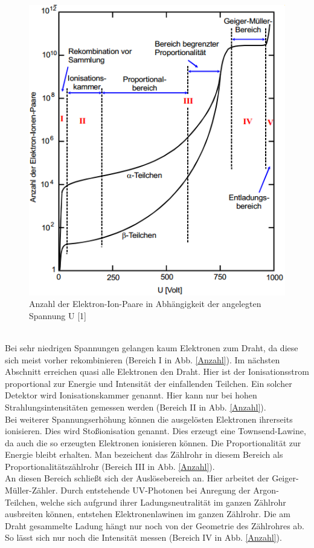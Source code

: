 	\begin{figure}[h]
		\begin{center}
		\includegraphics[scale=0.8]{Anzahl.png}
		\caption{Anzahl der Elektron-Ion-Paare in Abhängigkeit der angelegten Spannung U [1]}
		\label{Anzahl}
		\end{center}	
	\end{figure} \\
Bei sehr niedrigen Spannungen gelangen kaum Elektronen zum Draht, da diese sich meist vorher rekombinieren (Bereich I in Abb. \eqref{Anzahl}).
Im nächsten Abschnitt erreichen quasi alle Elektronen den Draht. Hier ist der Ionisationsstrom proportional zur Energie und Intensität der einfallenden Teilchen. Ein solcher Detektor wird Ionisationskammer genannt. Hier kann nur bei hohen Strahlungsintensitäten gemessen werden (Bereich II in Abb. \eqref{Anzahl}).\\
Bei weiterer Spannungserhöhung können die ausgelösten Elektronen ihrerseits ionisieren. Dies wird Stoßionisation genannt. Dies erzeugt eine Townsend-Lawine, da auch die so erzeugten Elektronen ionisieren können. Die Proportionalität zur Energie bleibt erhalten.
Man bezeichent das Zählrohr in diesem Bereich als Proportionalitätszählrohr (Bereich III in Abb. \eqref{Anzahl}).\\
An diesen Bereich schließt sich der Auslösebereich an. Hier arbeitet der Geiger-Müller-Zähler. Durch entstehende UV-Photonen bei Anregung der Argon-Teilchen, welche sich aufgrund ihrer Ladungsneutralität im ganzen Zählrohr ausbreiten können, entstehen Elektronenlawinen im ganzen Zählrohr. Die am Draht gesammelte Ladung hängt nur noch von der Geometrie des Zählrohres ab. So lässt sich nur noch die Intensität messen (Bereich IV in Abb. \eqref{Anzahl}). 

